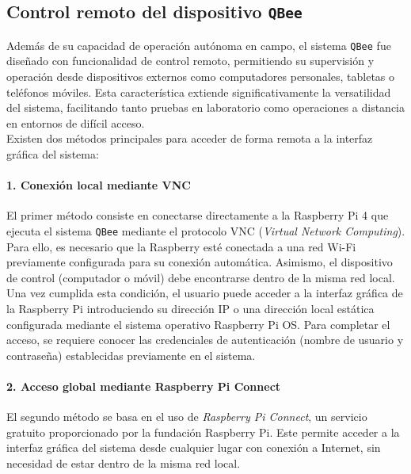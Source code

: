    \subsection{Control remoto del dispositivo \texttt{QBee}}

    Además de su capacidad de operación autónoma en campo, el sistema \texttt{QBee} fue diseñado con funcionalidad de control remoto, permitiendo su supervisión y operación desde dispositivos externos como computadores personales, tabletas o teléfonos móviles. Esta característica extiende significativamente la versatilidad del sistema, facilitando tanto pruebas en laboratorio como operaciones a distancia en entornos de difícil acceso.\\
    
    Existen dos métodos principales para acceder de forma remota a la interfaz gráfica del sistema:
    
    \paragraph{1. Conexión local mediante VNC}
    
    El primer método consiste en conectarse directamente a la Raspberry Pi 4 que ejecuta el sistema \texttt{QBee} mediante el protocolo VNC (\textit{Virtual Network Computing}). Para ello, es necesario que la Raspberry esté conectada a una red Wi-Fi previamente configurada para su conexión automática. Asimismo, el dispositivo de control (computador o móvil) debe encontrarse dentro de la misma red local.\\
    
    Una vez cumplida esta condición, el usuario puede acceder a la interfaz gráfica de la Raspberry Pi introduciendo su dirección IP o una dirección local estática configurada mediante el sistema operativo Raspberry Pi OS. Para completar el acceso, se requiere conocer las credenciales de autenticación (nombre de usuario y contraseña) establecidas previamente en el sistema.
    
    \paragraph{2. Acceso global mediante Raspberry Pi Connect}
    
    El segundo método se basa en el uso de \textit{Raspberry Pi Connect}, un servicio gratuito proporcionado por la fundación Raspberry Pi. Este permite acceder a la interfaz gráfica del sistema desde cualquier lugar con conexión a Internet, sin necesidad de estar dentro de la misma red local.\\
    
